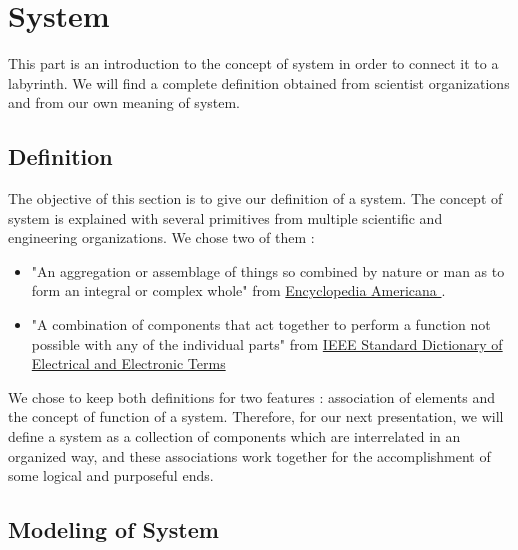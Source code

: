 \chapter{System}\label{System}

This part is an introduction to the concept of system in order to connect it to a labyrinth. We will find a complete definition obtained from scientist organizations and from our own meaning of system. 

\section{Definition}

The objective of this section is to give our definition of a system. The concept of system is explained with several primitives from multiple scientific and engineering organizations. We chose two of them :\begin{itemize}
\item "An aggregation or assemblage of things so combined by nature or man as to form an integral or complex whole" from \underline{Encyclopedia Americana
}.
\item  "A combination of components that act together to perform a function not possible with any of the individual parts" from  \underline{IEEE Standard Dictionary of Electrical and Electronic Terms}
\end{itemize} 

We chose to keep both definitions for two features : association of elements and the concept of function of a system. Therefore, for our next presentation, we will define a system as a collection of components which are interrelated in an organized way, and these associations work together for the accomplishment of some logical and purposeful ends. \label{definitionSystem}

\section{Modeling of System}\label{ModelingSystem}


